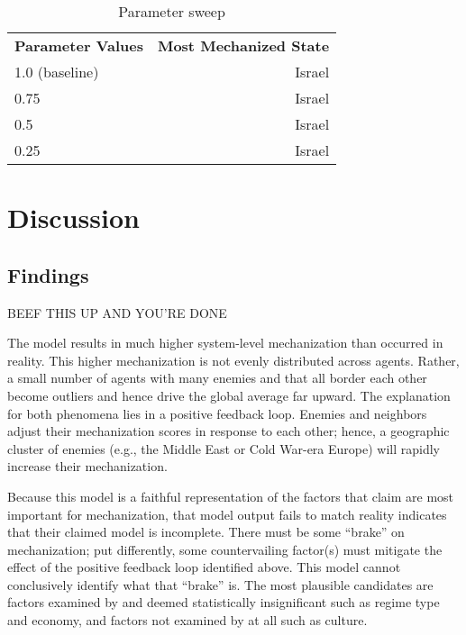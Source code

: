 \documentclass{article}
\begin{document}
\begin{table}[h]
	\centering
	\caption{Parameter sweep}
	\begin{tabular}{|l r|}
		\hline
		\textbf{Parameter Values} & \textbf{Most Mechanized State} \\ 
		1.0 (baseline) & Israel \\
		0.75 & Israel \\
		0.5 & Israel \\
		0.25 & Israel \\
		\hline
	\end{tabular}
\end{table}
\section{Discussion}

\subsection{Findings}

BEEF THIS UP AND YOU'RE DONE

The model results in much higher
system-level mechanization than occurred in reality. This higher
mechanization is not evenly distributed across agents. Rather, a small number of
agents with many enemies and that all border each other become outliers and
hence drive the global average far upward. The explanation for both phenomena
lies in a positive feedback loop. Enemies and neighbors adjust their
mechanization scores in response to each other; hence, a geographic cluster of
enemies (e.g., the Middle East or Cold War-era Europe) will rapidly increase their
mechanization.

Because this model is a faithful representation of the factors that \citet{sechser2010army} claim are
most important for mechanization, that model output fails to match reality
indicates that their claimed model is incomplete. There must be some ``brake''
on mechanization; put differently, some countervailing factor(s) must mitigate the
effect of the positive feedback loop identified above. This model cannot
conclusively identify what that ``brake'' is. The most plausible candidates are
factors examined by \citet{sechser2010army} and deemed statistically
insignificant such as regime type and economy, and factors not examined by
\citet{sechser2010army} at all such as culture.
\end{document}
